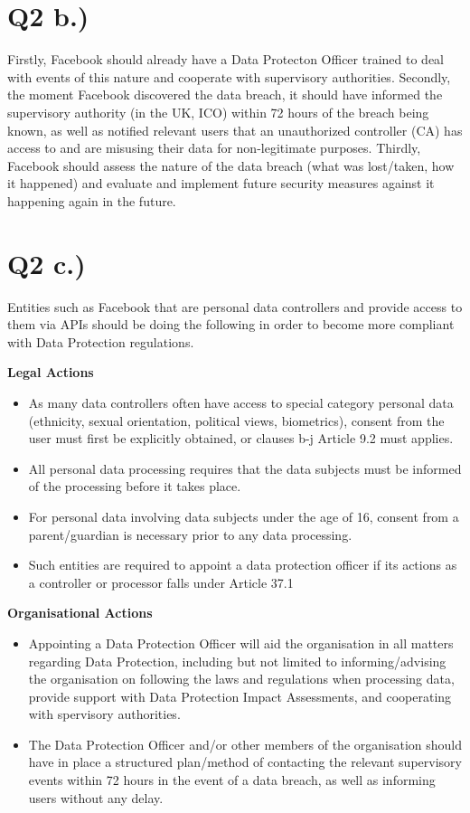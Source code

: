 \documentclass[a4paper]{article}
\begin{document}
\section*{Q2 b.)}

Firstly, Facebook should already have a Data Protecton Officer trained to deal with events of this nature and cooperate with supervisory authorities. Secondly, the moment Facebook discovered the data breach, it should have informed the supervisory authority (in the UK, ICO) within 72 hours of the breach being known, as well as notified relevant users that an unauthorized controller (CA) has access to and are misusing their data for non-legitimate purposes. Thirdly, Facebook should assess the nature of the data breach (what was lost/taken, how it happened) and evaluate and implement future security measures against it happening again in the future.

\section*{Q2 c.)}

Entities such as Facebook that are personal data controllers and provide access to them via APIs should be doing the following in order to become more compliant with Data Protection regulations.

\textbf{Legal Actions}
\begin{itemize}
  \item As many data controllers often have access to special category personal data (ethnicity, sexual orientation, political views, biometrics), consent from the user must first be explicitly obtained, or clauses b-j  Article 9.2 must applies.
  \item All personal data processing requires that the data subjects must be informed of the processing before it takes place.
  \item For personal data involving data subjects under the age of 16, consent from a parent/guardian is necessary prior to any data processing.
  \item Such entities are required to appoint a data protection officer if its actions as a controller or processor falls under Article 37.1
\end{itemize}

\textbf{Organisational Actions}
\begin{itemize}
  \item Appointing a Data Protection Officer will aid the organisation in all matters regarding Data Protection, including but not limited to informing/advising the organisation on following the laws and regulations when processing data, provide support with Data Protection Impact Assessments, and cooperating with spervisory authorities.
  \item The Data Protection Officer and/or other members of the organisation should have in place a structured plan/method of contacting the relevant supervisory events within 72 hours in the event of a data breach, as well as informing users without any delay.
\end{itemize}
\end{document}
